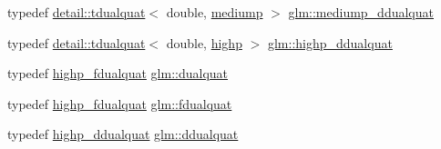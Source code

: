 \begin{DoxyCompactItemize}
\item 
typedef \hyperlink{structglm_1_1detail_1_1tdualquat}{detail\+::tdualquat}$<$ double, \hyperlink{namespaceglm_a0f04f086094c747d227af4425893f545a6416f3ea0c9025fb21ed50c4d6620482}{mediump} $>$ \hyperlink{group__gtc__dual__quaternion_ga62d8cbf30e2afd0b1044204268a69066}{glm\+::mediump\+\_\+ddualquat}
\item 
typedef \hyperlink{structglm_1_1detail_1_1tdualquat}{detail\+::tdualquat}$<$ double, \hyperlink{namespaceglm_a0f04f086094c747d227af4425893f545ac6f7eab42eacbb10d59a58e95e362074}{highp} $>$ \hyperlink{group__gtc__dual__quaternion_ga61b654c21f080135aedcf23461eb1037}{glm\+::highp\+\_\+ddualquat}
\item 
typedef \hyperlink{group__gtc__dual__quaternion_ga2ed3283c09d3ffaf52a0e0a4b248eab6}{highp\+\_\+fdualquat} \hyperlink{group__gtc__dual__quaternion_ga2f6227b5f9dc08a2e7682065a84b3aa9}{glm\+::dualquat}
\item 
typedef \hyperlink{group__gtc__dual__quaternion_ga2ed3283c09d3ffaf52a0e0a4b248eab6}{highp\+\_\+fdualquat} \hyperlink{group__gtc__dual__quaternion_ga436906129bc69ca5059555cafcbac9fd}{glm\+::fdualquat}
\item 
typedef \hyperlink{group__gtc__dual__quaternion_ga61b654c21f080135aedcf23461eb1037}{highp\+\_\+ddualquat} \hyperlink{group__gtc__dual__quaternion_ga373431ffdd82d5c03c258217a9e1f1a6}{glm\+::ddualquat}
\end{DoxyCompactItemize}
